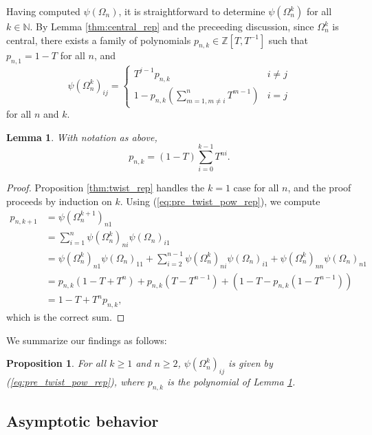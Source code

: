 \documentclass[11pt,hyp,]{nyjm}
\newcommand{\Z}{\mathbb{Z}}
\newcommand{\N}{\mathbb{N}}
\numberwithin{thm}{section}
\newtheorem{prop}[thm]{Proposition}
\newtheorem{lemma}[thm]{Lemma}
\theoremstyle{definition}
\theoremstyle{remark}
\begin{document}
	Having computed $\psi(\Omega_n)$, it is straightforward to determine $\psi(\Omega_n^k)$ for all $k \in \N$. By Lemma \ref{thm:central_rep} and the preceeding discussion, since $\Omega^k_n$ is central, there exists a family of polynomials $p_{n,k} \in \Z[T,T^{-1}]$ such that $p_{n,1} = 1 - T$ for all $n$, and
	\begin{equation}
		\label{eq:pre_twist_pow_rep}
		\psi(\Omega^k_n)_{ij} = \begin{cases}
			T^{j - 1}p_{n,k} & i \neq j \\
			1 - p_{n,k}(\sum_{m = 1, m \neq i}^n T^{m - 1}) & i = j
		\end{cases}
	\end{equation}
	for all $n$ and $k$.
	
	\begin{lemma}
		\label{thm:twist_pow_q}
		With notation as above,
		$$
		p_{n,k} = (1 - T)\sum_{i = 0}^{k - 1} T^{ni}.
		$$
	\end{lemma}

	\begin{proof}
		Proposition \ref{thm:twist_rep} handles the $k = 1$ case for all $n$, and the proof proceeds by induction on $k$. Using (\ref{eq:pre_twist_pow_rep}), we compute
		\begin{align*}
			p_{n,k+1} &= \psi(\Omega_n^{k+1})_{n1} \\
			&= \sum_{i = 1}^n \psi(\Omega_n^k)_{ni}\psi(\Omega_n)_{i1} \\
			&= \psi(\Omega_n^k)_{n1}\psi(\Omega_n)_{11} + \sum_{i = 2}^{n - 1} \psi(\Omega_n^k)_{ni}\psi(\Omega_n)_{i1} + \psi(\Omega_n^k)_{nn}\psi(\Omega_n)_{n1} \\
			&= p_{n,k}(1 - T + T^n) + p_{n,k}(T - T^{n - 1}) + (1 - T - p_{n,k}(1 - T^{n - 1})) \\
			&= 1 - T + T^np_{n,k},
		\end{align*}
		which is the correct sum.
	\end{proof}

	We summarize our findings as follows:
	
	\begin{prop}
		\label{thm:twist_pow_rep}
		For all $k \geq 1$ and $n \geq 2$, $\psi(\Omega^k_n)_{ij}$ is given by (\ref{eq:pre_twist_pow_rep}), where $p_{n,k}$ is the polynomial of Lemma \ref{thm:twist_pow_q}.
	\end{prop}
	
	\subsection{Asymptotic behavior}
	\label{sec:ab}
\end{document}
